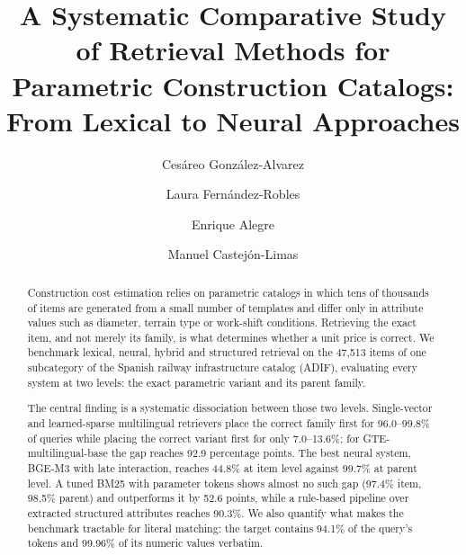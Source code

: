 \documentclass[preprint,12pt]{elsarticle}
\begin{document}
\linenumbers
\begin{frontmatter}


\title{A Systematic Comparative Study of Retrieval Methods for Parametric Construction Catalogs: From Lexical to Neural Approaches}

\author[deptA,b]{Cesáreo González-Alvarez}

\author[deptA]{Laura Fernández-Robles}
\author[deptA]{Enrique Alegre}
\author[deptA]{Manuel Castejón-Limas}


\begin{abstract}

Construction cost estimation relies on parametric catalogs in which tens of thousands
of items are generated from a small number of templates and differ only in attribute
values such as diameter, terrain type or work-shift conditions. Retrieving the exact
item, and not merely its family, is what determines whether a unit price is correct.
We benchmark lexical, neural, hybrid and structured retrieval on the 47,513 items of
one subcategory of the Spanish railway infrastructure catalog (ADIF), evaluating every
system at two levels: the exact parametric variant and its parent family.

The central finding is a systematic dissociation between those two levels.
Single-vector and learned-sparse multilingual retrievers place the correct family
first for 96.0--99.8\% of queries while placing the correct variant first for only
7.0--13.6\%; for GTE-multilingual-base the gap reaches 92.9 percentage points. The best
neural system, BGE-M3 with late interaction, reaches 44.8\% at item level against 99.7\%
at parent level. A tuned BM25 with parameter tokens shows almost no
such gap (97.4\% item, 98.5\% parent) and outperforms it by 52.6 points, while a
rule-based pipeline over extracted structured attributes reaches 90.3\%. We also
quantify what makes the benchmark tractable for literal matching: the target contains
94.1\% of the query's tokens and 99.96\% of its numeric values verbatim.


\end{abstract}
\end{frontmatter}
\end{document}
